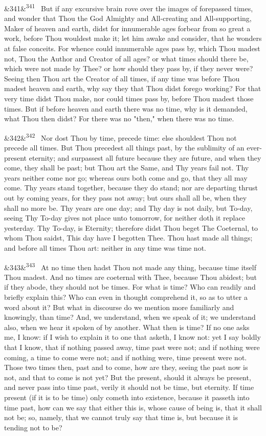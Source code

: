 \documentclass[12pt]{article}
\newcommand{\para}[1][]{\par\noindent\ifx&#1&\else\textsuperscript{\footnotesize #1}~\fi}
\begin{document}
\para[341] But if any excursive brain rove over the images of forepassed times, and wonder that Thou the God Almighty and All-creating and All-supporting, Maker of heaven and earth, didst for innumerable ages forbear from so great a work, before Thou wouldest make it; let him awake and consider, that he wonders at false conceits. For whence could innumerable ages pass by, which Thou madest not, Thou the Author and Creator of all ages? or what times should there be, which were not made by Thee? or how should they pass by, if they never were? Seeing then Thou art the Creator of all times, if any time was before Thou madest heaven and earth, why say they that Thou didst forego working? For that very time didst Thou make, nor could times pass by, before Thou madest those times. But if before heaven and earth there was no time, why is it demanded, what Thou then didst? For there was no "then," when there was no time.

\para[342] Nor dost Thou by time, precede time: else shouldest Thou not precede all times. But Thou precedest all things past, by the sublimity of an ever-present eternity; and surpassest all future because they are future, and when they come, they shall be past; but Thou art the Same, and Thy years fail not. Thy years neither come nor go; whereas ours both come and go, that they all may come. Thy years stand together, because they do stand; nor are departing thrust out by coming years, for they pass not away; but ours shall all be, when they shall no more be. Thy years are one day; and Thy day is not daily, but To-day, seeing Thy To-day gives not place unto tomorrow, for neither doth it replace yesterday. Thy To-day, is Eternity; therefore didst Thou beget The Coeternal, to whom Thou saidst, This day have I begotten Thee. Thou hast made all things; and before all times Thou art: neither in any time was time not.

\para[343] At no time then hadst Thou not made any thing, because time itself Thou madest. And no times are coeternal with Thee, because Thou abidest; but if they abode, they should not be times. For what is time? Who can readily and briefly explain this? Who can even in thought comprehend it, so as to utter a word about it? But what in discourse do we mention more familiarly and knowingly, than time? And, we understand, when we speak of it; we understand also, when we hear it spoken of by another. What then is time? If no one asks me, I know: if I wish to explain it to one that asketh, I know not: yet I say boldly that I know, that if nothing passed away, time past were not; and if nothing were coming, a time to come were not; and if nothing were, time present were not. Those two times then, past and to come, how are they, seeing the past now is not, and that to come is not yet? But the present, should it always be present, and never pass into time past, verily it should not be time, but eternity. If time present (if it is to be time) only cometh into existence, because it passeth into time past, how can we say that either this is, whose cause of being is, that it shall not be; so, namely, that we cannot truly say that time is, but because it is tending not to be?
\end{document}
